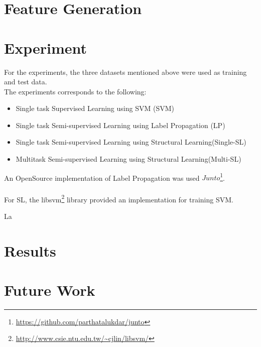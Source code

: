 \documentclass[4pt,a4paper,twocolumn]{article}
\begin{document}
\section{Feature Generation}

\section{Experiment}
For the experiments, the three datasets mentioned above were used as training and test data.\\
The experiments corresponds to the following:
\begin{itemize}
	\item Single task Supervised Learning using SVM (SVM)
	\item Single task Semi-supervised Learning using Label Propagation (LP)
	\item Single task Semi-supervised Learning using Structural Learning(Single-SL)
	\item Multitask Semi-supervised Learning using Structural Learning(Multi-SL)
\end{itemize}

An OpenSource implementation of Label Propagation was used $Junto$\footnote{ \url{https://github.com/parthatalukdar/junto} }.\\
\\
For SL, the libsvm\footnote{\url{http://www.csie.ntu.edu.tw/~cjlin/libsvm/}} library provided an implementation for training SVM.




La

\section{Results}

\section{Future Work}

{}

\end{document}
